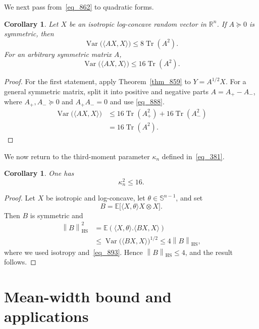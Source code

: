 \documentclass[12pt]{article}
\newtheorem{corollary}[theorem]{Corollary}
\theoremstyle{definition}
\theoremstyle{remark}
\newcommand{\R}{\mathbb R}
\newcommand{\E}{\mathbb E}
\newcommand{\Var}{\operatorname{Var}}
\newcommand{\Tr}{\operatorname{Tr}}
\newcommand{\HS}{\mathrm{HS}}
\newcommand{\norm}[1]{\left\lVert #1\right\rVert}
\begin{document}
We next pass from~\eqref{eq_862} to quadratic forms.

\begin{corollary}\label{cor_885}
Let $X$ be an isotropic log-concave random vector in $\R^n$. If
$A\succeq0$ is symmetric, then
\begin{equation}\label{eq_888}
  \Var\bigl(\langle AX,X\rangle\bigr)
  \leq8\Tr(A^2).
\end{equation}
For an arbitrary symmetric matrix $A$,
\begin{equation}\label{eq_893}
  \Var\bigl(\langle AX,X\rangle\bigr)
  \leq16\Tr(A^2).
\end{equation}
\end{corollary}

\begin{proof}
For the first statement, apply Theorem~\ref{thm_859}
to $Y=A^{1/2}X$. For a general symmetric matrix, split it into positive and negative parts
$A=A_+-A_-$, where $A_+,A_-\succeq0$ and $A_+A_-=0$ and use 
\eqref{eq_888}.
\begin{align*}
  \Var\bigl(\langle AX,X\rangle\bigr)
  &\leq16\Tr(A_+^2)+16\Tr(A_-^2)\\
  &=16\Tr(A^2).
\end{align*}
\end{proof}

We now return to the third-moment parameter $\kappa_n$ defined
in~\eqref{eq_381}.

\begin{corollary}\label{cor_915}
One has
\begin{equation}\label{eq_917}
  \kappa_n^2\leq16.
\end{equation}
\end{corollary}

\begin{proof}
Let $X$ be isotropic and log-concave, let
$\theta\in\mathbb S^{n-1}$, and set
\[
  B=\E\bigl[\langle X,\theta\rangle X\otimes X\bigr].
\]
Then $B$ is symmetric and
\begin{align*}
  \norm{B}_{\HS}^2
  &=\E\left(\langle X,\theta\rangle.
               \langle BX,X\rangle\right)\\
  &\leq \Var\bigl(\langle BX,X\rangle\bigr)^{1/2}
  \leq4\norm{B}_{\HS},
\end{align*}
where we used isotropy and~\eqref{eq_893}. Hence
$\norm{B}_{\HS}\leq4$, and the result follows.
\end{proof}

\section{Mean-width bound and applications}\label{sec_940}
\end{document}
